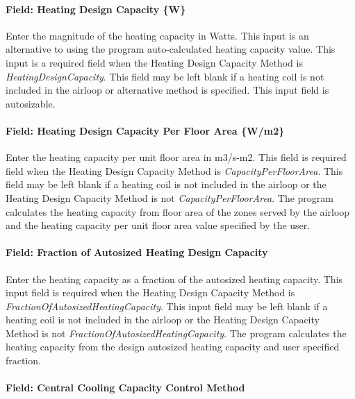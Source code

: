 \paragraph{Field: Heating Design Capacity \{W\}}\label{field-heating-design-capacity-w-1}

Enter the magnitude of the heating capacity in Watts. This input is an alternative to using the program auto-calculated heating capacity value. This input is a required field when the Heating Design Capacity Method is \emph{HeatingDesignCapacity}. This field may be left blank if a heating coil is not included in the airloop or alternative method is specified. This input field is autosizable.

\paragraph{Field: Heating Design Capacity Per Floor Area \{W/m2\}}\label{field-heating-design-capacity-per-floor-area-wm2-1}

Enter the heating capacity per unit floor area in m3/s-m2. This field is required field when the Heating Design Capacity Method is \emph{CapacityPerFloorArea}. This field may be left blank if a heating coil is not included in the airloop or the Heating Design Capacity Method is not \emph{CapacityPerFloorArea}. The program calculates the heating capacity from floor area of the zones served by the airloop and the heating capacity per unit floor area value specified by the user.

\paragraph{Field: Fraction of Autosized Heating Design Capacity}\label{field-fraction-of-autosized-heating-design-capacity-1}

Enter the heating capacity as a fraction of the autosized heating capacity. This input field is required when the Heating Design Capacity Method is \emph{FractionOfAutosizedHeatingCapacity}. This input field may be left blank if a heating coil is not included in the airloop or the Heating Design Capacity Method is not \emph{FractionOfAutosizedHeatingCapacity}. The program calculates the heating capacity from the design autosized heating capacity and user specified fraction.

\paragraph{Field: Central Cooling Capacity Control Method}\label{field-central-cooling-capacity-control-method}

